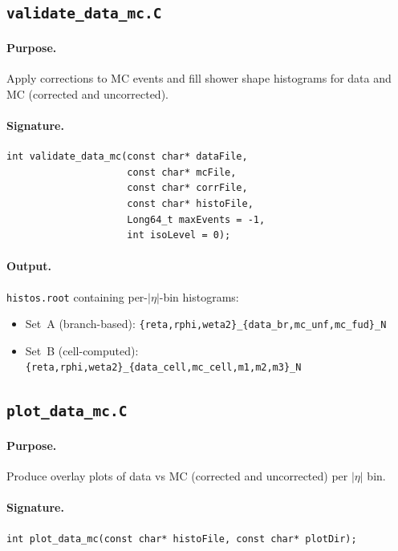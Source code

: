 \documentclass[12pt,a4paper]{article}
\begin{document}
\subsection{\texttt{validate\_data\_mc.C}}
\label{sec:scripts:validate}

\paragraph{Purpose.} Apply corrections to MC events and fill shower shape
histograms for data and MC (corrected and uncorrected).

\paragraph{Signature.}
\begin{lstlisting}[style=cppstyle]
int validate_data_mc(const char* dataFile,
                     const char* mcFile,
                     const char* corrFile,
                     const char* histoFile,
                     Long64_t maxEvents = -1,
                     int isoLevel = 0);
\end{lstlisting}

\paragraph{Output.} \texttt{histos.root} containing per-$|\eta|$-bin
histograms:
\begin{itemize}
  \item Set~A (branch-based): \texttt{\{reta,rphi,weta2\}\_\{data\_br,mc\_unf,mc\_fud\}\_N}
  \item Set~B (cell-computed): \texttt{\{reta,rphi,weta2\}\_\{data\_cell,mc\_cell,m1,m2,m3\}\_N}
\end{itemize}

\subsection{\texttt{plot\_data\_mc.C}}
\label{sec:scripts:plot_data_mc}

\paragraph{Purpose.} Produce overlay plots of data vs MC (corrected and
uncorrected) per $|\eta|$ bin.

\paragraph{Signature.}
\begin{lstlisting}[style=cppstyle]
int plot_data_mc(const char* histoFile, const char* plotDir);
\end{lstlisting}
\end{document}
